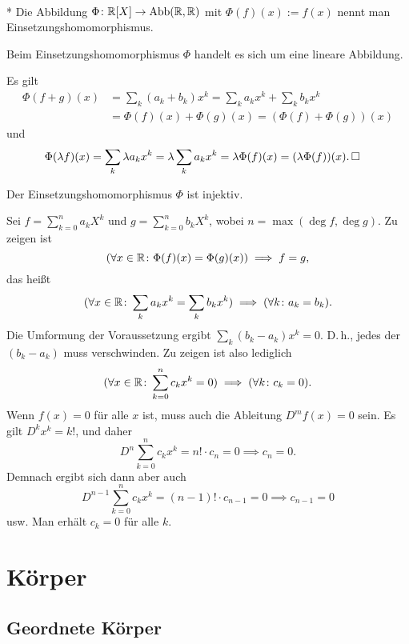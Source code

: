 \begin{Definition}[Einsetzungshomomorphismus]\mbox{}\\*
Die Abbildung $\Phi\colon\mathbb R[X]\to\operatorname{Abb}(\mathbb R,\mathbb R)$ mit $\Phi(f)(x):=f(x)$
nennt man Einsetzungshomomorphismus.
\end{Definition}

\begin{Satz}
Beim Einsetzungshomomorphismus $\Phi$ handelt es sich um eine lineare
Abbildung.
\end{Satz}
\begin{Beweis} Es gilt
\begin{align*}
\Phi(f+g)(x) &= \sum_k (a_k + b_k) x^k = \sum_k a_k x^k + \sum_k b_k x^k\\
&= \Phi(f)(x) + \Phi(g)(x) = (\Phi(f)+\Phi(g))(x)
\end{align*}
und
\begin{align*}
\Phi(\lambda f)(x) &= \sum_k \lambda a_k x^k = \lambda\sum_k a_k x^k
= \lambda\Phi(f)(x) = (\lambda\Phi(f))(x).\,\square
\end{align*}
\end{Beweis}

\newpage
\begin{Satz}
Der Einsetzungshomomorphismus $\Phi$ ist injektiv.
\end{Satz}
\begin{Beweis} Sei $f=\sum_{k=0}^n a_k X^k$
und $g=\sum_{k=0}^n b_k X^k$, wobei $n=\max(\deg f,\deg g)$.
Zu zeigen ist
\[(\forall x\in\mathbb R\colon \Phi(f)(x)=\Phi(g)(x))\implies f=g,\]
das heißt
\[(\forall x\in\mathbb R\colon \sum_k a_k x^k = \sum_k b_k x^k)\implies (\forall k\colon a_k=b_k).\]
Die Umformung der Voraussetzung ergibt $\sum_k (b_k-a_k)x^k = 0$.
D.\,h., jedes der $(b_k-a_k)$ muss verschwinden. Zu zeigen ist also
lediglich
\[(\forall x\in\mathbb R\colon \sum_{k=0}^n c_k x^k = 0)\implies (\forall k\colon c_k=0).\]
Wenn $f(x)=0$ für alle $x$ ist, muss auch die Ableitung $D^m f(x)=0$
sein. Es gilt $D^k x^k = k!$, und daher
\[D^n\sum_{k=0}^n c_k x^k = n!\cdot c_n = 0 \implies c_n=0.\]
Demnach ergibt sich dann aber auch
\[D^{n-1}\sum_{k=0}^n c_k x^k = (n-1)!\cdot c_{n-1} = 0\implies c_{n-1}=0\]
usw. Man erhält $c_k=0$ für alle $k$.\;\qedsymbol
\end{Beweis}

\section{Körper}

\subsection{Geordnete Körper}


